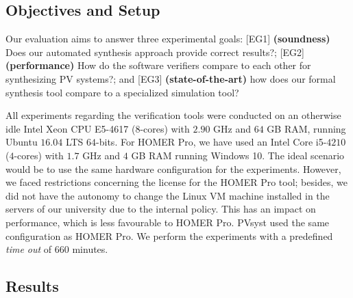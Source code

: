 \documentclass[runningheads]{llncs}
\begin{document}
\subsection{Objectives and Setup}

Our evaluation aims to answer three experimental goals: [EG1] \textbf{(soundness)} Does our automated synthesis approach provide correct results?; [EG2] \textbf{(performance)} How do the software verifiers compare to each other for synthesizing PV systems?; and [EG3] \textbf{(state-of-the-art)} how does our formal synthesis tool compare to a specialized simulation tool?

All experiments regarding the verification tools were conducted on an otherwise idle Intel Xeon CPU E5-4617 ($8$-cores) with $2.90$ GHz and $64$ GB RAM, running Ubuntu $16.04$ LTS $64$-bits. For HOMER Pro, we have used an Intel Core i5-$4210$ ($4$-cores) with $1.7$ GHz and $4$ GB RAM running Windows 10. The ideal scenario would be to use the same hardware configuration for the experiments. However, we faced restrictions concerning the license for the HOMER Pro tool; besides, we did not have the autonomy to change the Linux VM machine installed in the servers of our university due to the internal policy. This has an impact on performance, which is less favourable to HOMER Pro. PVsyst used the same configuration as HOMER Pro. We perform the experiments with a predefined \textit{time out} of $660$ minutes.




\subsection{Results}
\end{document}
